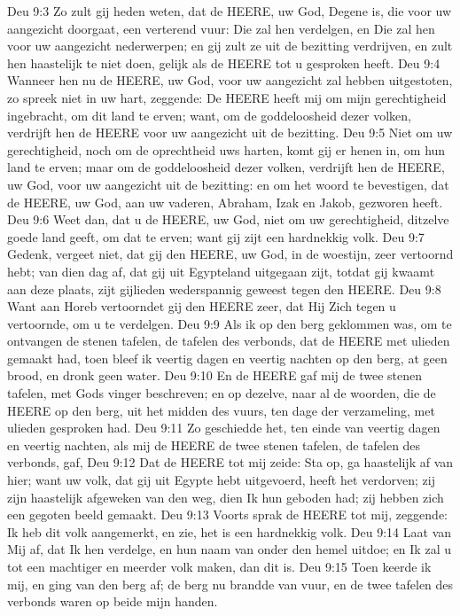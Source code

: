 Deu 9:3  Zo zult gij heden weten, dat de HEERE, uw God, Degene is, die voor uw aangezicht doorgaat, een verterend vuur: Die zal hen verdelgen, en Die zal hen voor uw aangezicht nederwerpen; en gij zult ze uit de bezitting verdrijven, en zult hen haastelijk te niet doen, gelijk als de HEERE tot u gesproken heeft.
Deu 9:4  Wanneer hen nu de HEERE, uw God, voor uw aangezicht zal hebben uitgestoten, zo spreek niet in uw hart, zeggende: De HEERE heeft mij om mijn gerechtigheid ingebracht, om dit land te erven; want, om de goddeloosheid dezer volken, verdrijft hen de HEERE voor uw aangezicht uit de bezitting.
Deu 9:5  Niet om uw gerechtigheid, noch om de oprechtheid uws harten, komt gij er henen in, om hun land te erven; maar om de goddeloosheid dezer volken, verdrijft hen de HEERE, uw God, voor uw aangezicht uit de bezitting: en om het woord te bevestigen, dat de HEERE, uw God, aan uw vaderen, Abraham, Izak en Jakob, gezworen heeft.
Deu 9:6  Weet dan, dat u de HEERE, uw God, niet om uw gerechtigheid, ditzelve goede land geeft, om dat te erven; want gij zijt een hardnekkig volk.
Deu 9:7  Gedenk, vergeet niet, dat gij den HEERE, uw God, in de woestijn, zeer vertoornd hebt; van dien dag af, dat gij uit Egypteland uitgegaan zijt, totdat gij kwaamt aan deze plaats, zijt gijlieden wederspannig geweest tegen den HEERE.
Deu 9:8  Want aan Horeb vertoorndet gij den HEERE zeer, dat Hij Zich tegen u vertoornde, om u te verdelgen.
Deu 9:9  Als ik op den berg geklommen was, om te ontvangen de stenen tafelen, de tafelen des verbonds, dat de HEERE met ulieden gemaakt had, toen bleef ik veertig dagen en veertig nachten op den berg, at geen brood, en dronk geen water.
Deu 9:10  En de HEERE gaf mij de twee stenen tafelen, met Gods vinger beschreven; en op dezelve, naar al de woorden, die de HEERE op den berg, uit het midden des vuurs, ten dage der verzameling, met ulieden gesproken had.
Deu 9:11  Zo geschiedde het, ten einde van veertig dagen en veertig nachten, als mij de HEERE de twee stenen tafelen, de tafelen des verbonds, gaf,
Deu 9:12  Dat de HEERE tot mij zeide: Sta op, ga haastelijk af van hier; want uw volk, dat gij uit Egypte hebt uitgevoerd, heeft het verdorven; zij zijn haastelijk afgeweken van den weg, dien Ik hun geboden had; zij hebben zich een gegoten beeld gemaakt.
Deu 9:13  Voorts sprak de HEERE tot mij, zeggende: Ik heb dit volk aangemerkt, en zie, het is een hardnekkig volk.
Deu 9:14  Laat van Mij af, dat Ik hen verdelge, en hun naam van onder den hemel uitdoe; en Ik zal u tot een machtiger en meerder volk maken, dan dit is.
Deu 9:15  Toen keerde ik mij, en ging van den berg af; de berg nu brandde van vuur, en de twee tafelen des verbonds waren op beide mijn handen.
